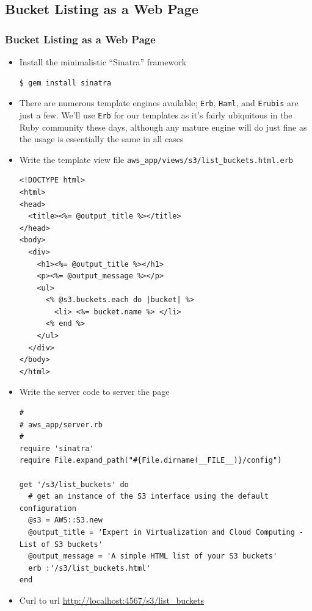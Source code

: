 \documentclass{beamer}
\begin{document}
\subsection{Bucket Listing as a Web Page}
\begin{frame}
\frametitle{Bucket Listing as a Web Page}
\begin{itemize}
\item Install the minimalistic ``Sinatra'' framework
\lstset{language=shell}
\begin{lstlisting}[escapechar=!]
$ gem install sinatra
\end{lstlisting}


\item There are numerous template engines available; \texttt{Erb}, \texttt{Haml}, and \texttt{Erubis} are
just a few. We’ll use \texttt{Erb} for our templates as it’s fairly ubiquitous in the Ruby community these days, although any mature engine will do just fine as the usage is essentially the same in all cases

\item Write the template view file \texttt{aws\_app/views/s3/list\_buckets.html.erb}

\lstset{language=Ruby, style=eclipse}
\begin{lstlisting}[escapechar=?]
<!DOCTYPE html>
<html>
<head>
  <title><%= @output_title %></title>
</head>
<body>
  <div>
    <h1><%= @output_title %></h1>
    <p><%= @output_message %></p>
    <ul>
      <% @s3.buckets.each do |bucket| %>
        <li> <%= bucket.name %> </li>
      <% end %>
    </ul>
  </div>
</body>
</html>
\end{lstlisting}


\item Write the server code to server the page
\lstset{language=Ruby, style=eclipse}
\begin{lstlisting}[escapechar=!]
#
# aws_app/server.rb
#
require 'sinatra'
require File.expand_path("#{File.dirname(__FILE__)}/config")

get '/s3/list_buckets' do
  # get an instance of the S3 interface using the default configuration
  @s3 = AWS::S3.new
  @output_title = 'Expert in Virtualization and Cloud Computing - List of S3 buckets'
  @output_message = 'A simple HTML list of your S3 buckets'
  erb :'/s3/list_buckets.html'
end
\end{lstlisting}

\item Curl to url \url{http://localhost:4567/s3/list_buckets}
\end{itemize}
\end{frame}
\end{document}
